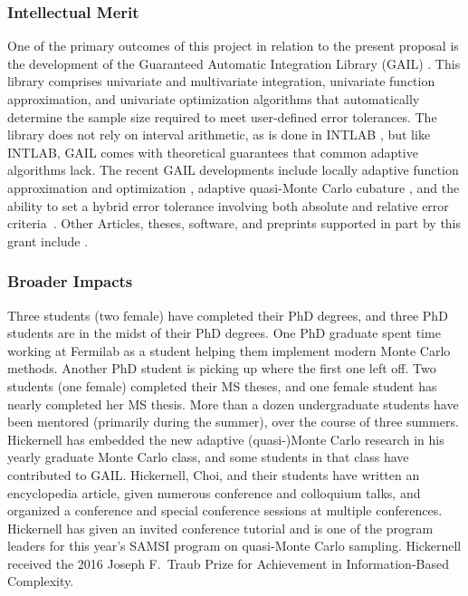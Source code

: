 \documentclass[11pt]{NSFamsart}
\begin{document}
\subsubsection{Intellectual Merit}
One of the primary outcomes of this project in relation to the present proposal is the development of the Guaranteed Automatic Integration Library (GAIL) \cite{ChoEtal17b}.  This library comprises univariate and multivariate integration, univariate function approximation, and univariate optimization algorithms that automatically determine the sample size required to meet user-defined error tolerances.  The library does not rely on interval arithmetic, as is done in INTLAB \cite{MoKeCl09, Rum99a, Rum10a}, but like INTLAB, GAIL comes with theoretical guarantees that common adaptive algorithms lack. The recent GAIL developments include locally adaptive function approximation and optimization \cite{ChoEtal17a, Din15a}, adaptive quasi-Monte Carlo cubature \cite{HicJim16a, JimHic16a}, and the ability to set a hybrid error tolerance involving both absolute and relative error criteria~\cite{HicEtal17a}.  Other Articles, theses,  software, and preprints supported in part by this grant include 
\cite{ala_augmented_2017, 
	GilEtal16a,
	GilJim16b,
	HicEtal18a,	
	Hic17a,
	JohFasHic18a,
	Li16a,
	Liu17a,
	mccourt_stable_2017,
	mishra_hybrid_nodate,
	mishra_stable_nodate, 
	rashidinia_stable_nodate,
	vu_rbf-fd_nodate,
	Zha17a,
	Zho15a,
	ZhoHic15a}.
    
\subsubsection{Broader Impacts}  Three students (two female) have completed their PhD degrees, and three PhD students are in the midst of their PhD degrees.  One PhD graduate spent time working at Fermilab as a student helping them implement modern Monte Carlo methods.  Another PhD student is picking up where the first one left off.  Two students (one female) completed their MS theses, and one female student has nearly completed her MS thesis. More than a dozen undergraduate students have been mentored (primarily during the summer),  over the course of three summers.  Hickernell has embedded the new adaptive (quasi-)Monte Carlo research in his yearly graduate Monte Carlo class, and some students in that class have contributed to GAIL.  Hickernell, Choi, and their students have written an encyclopedia article, given numerous conference and colloquium talks, and organized a conference and special conference sessions at multiple conferences.  Hickernell has given an invited conference tutorial and is one of the program leaders for this year's SAMSI program on quasi-Monte Carlo sampling. Hickernell received the 2016 Joseph F.\ Traub Prize for Achievement in Information-Based Complexity.
\end{document}
